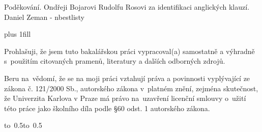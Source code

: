 \documentclass[12pt,a4paper]{report}
\let\openright=\clearpage
\begin{document}
\newpage



\openright

\noindent
Poděkování.
Ondřeji Bojarovi
Rudolfu Rosovi za identifikaci anglických klauzí.
Daniel Zeman - nbestlisty

\newpage


\vglue 0pt plus 1fill

\noindent
Prohlašuji, že jsem tuto bakalářskou práci vypracoval(a) samostatně a výhradně
s~použitím citovaných pramenů, literatury a dalších odborných zdrojů.

\medskip\noindent
Beru na~vědomí, že se na moji práci vztahují práva a povinnosti vyplývající
ze zákona č. 121/2000 Sb., autorského zákona v~platném znění, zejména skutečnost,
že Univerzita Karlova v Praze má právo na~uzavření licenční smlouvy o~užití této
práce jako školního díla podle §60 odst. 1 autorského zákona.

\vspace{10mm}

\hbox{\hbox to 0.5\hbox to 0.5}

\vspace{20mm}
\newpage

\end{document}
